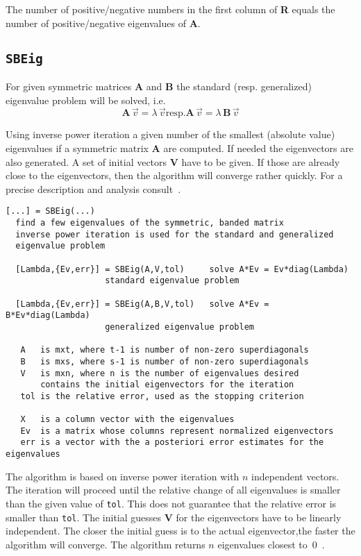 \documentclass[11pt]{article}
\begin{document}
The number of positive/negative numbers in the first column of \textbf{R}
equals the number of positive/negative eigenvalues of \textbf{A}.


\subsection{\texttt{SBEig}}
For given symmetric matrices \textbf{A} and \textbf{B} the standard
(resp. generalized) eigenvalue problem will be solved, i.e.
\[ \mathbf{A}\,\vec v=\lambda\,\vec v \text{resp.}
   \mathbf{A}\,\vec v=\lambda\,\mathbf{B}\,\vec v  \]

Using inverse power iteration a given number of the smallest (absolute value)
eigenvalues if a symmetric matrix \textbf{A} are computed. If needed the
eigenvectors are also generated.  A set of initial vectors \textbf{V} have to
be given. If those are already close to the eigenvectors, then the algorithm
will converge rather quickly. For a precise description and analysis
consult~\cite{GoluVanLoan96}.
\begin{verbatim}
[...] = SBEig(...)
  find a few eigenvalues of the symmetric, banded matrix
  inverse power iteration is used for the standard and generalized
  eigenvalue problem

  [Lambda,{Ev,err}] = SBEig(A,V,tol)     solve A*Ev = Ev*diag(Lambda)
                    standard eigenvalue problem

  [Lambda,{Ev,err}] = SBEig(A,B,V,tol)   solve A*Ev = B*Ev*diag(Lambda)
                    generalized eigenvalue problem

   A   is mxt, where t-1 is number of non-zero superdiagonals
   B   is mxs, where s-1 is number of non-zero superdiagonals
   V   is mxn, where n is the number of eigenvalues desired
       contains the initial eigenvectors for the iteration
   tol is the relative error, used as the stopping criterion

   X   is a column vector with the eigenvalues
   Ev  is a matrix whose columns represent normalized eigenvectors
   err is a vector with the a posteriori error estimates for the eigenvalues
\end{verbatim}

The algorithm is based on inverse power iteration 
  with $n$ independent vectors.
The iteration will proceed until the relative change of all eigenvalues is
smaller than the given value of \texttt{tol}. This does not guarantee that the
relative error is smaller than \texttt{tol}.  The initial guesses \textbf{V}
for the eigenvectors have to be linearly independent. The closer the initial
guess is to the actual eigenvector,the faster the algorithm will converge. 
The algorithm returns $n$ eigenvalues closest to~0~.
\end{document}
